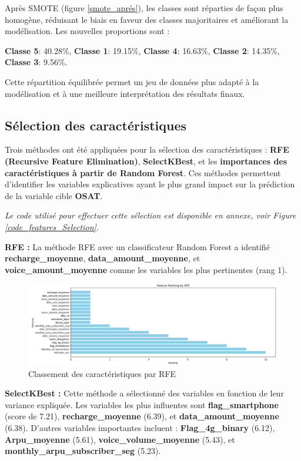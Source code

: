 Après SMOTE (figure \ref{smote_aprés}), les classes sont réparties de façon plus homogène, réduisant le biais en faveur des classes majoritaires et améliorant la modélisation. Les nouvelles proportions sont :

\textbf{Classe 5}: 40.28\%, \textbf{Classe 1}: 19.15\%, \textbf{Classe 4}: 16.63\%, \textbf{Classe 2}: 14.35\%, \textbf{Classe 3}: 9.56\%.

Cette répartition équilibrée permet un jeu de données plus adapté à la modélisation et à une meilleure interprétation des résultats finaux.

\subsection{Sélection des caractéristiques}
Trois méthodes ont été appliquées pour la sélection des caractéristiques : \textbf{RFE (Recursive Feature Elimination)}, \textbf{SelectKBest}, et les \textbf{importances des caractéristiques à partir de Random Forest}. Ces méthodes permettent d'identifier les variables explicatives ayant le plus grand impact sur la prédiction de la variable cible \textbf{OSAT}. 

\textit{Le code utilisé pour effectuer cette sélection est disponible en annexe, voir Figure \ref{code_features_Selection}.}

\textbf{RFE :} La méthode RFE avec un classificateur Random Forest a identifié \textbf{recharge\_moyenne}, \textbf{data\_amount\_moyenne}, et \textbf{voice\_amount\_moyenne} comme les variables les plus pertinentes (rang 1). 

\begin{figure}[H]
    \centering
    \includegraphics[width=0.8\linewidth]{capture_sas_65.png}
    \caption{Classement des caractéristiques par RFE}
\end{figure}

\textbf{SelectKBest :} Cette méthode a sélectionné des variables en fonction de leur variance expliquée. Les variables les plus influentes sont \textbf{flag\_smartphone} (score de 7.21), \textbf{recharge\_moyenne} (6.39), et \textbf{data\_amount\_moyenne} (6.38). D'autres variables importantes incluent :
\textbf{Flag\_4g\_binary} (6.12), \textbf{Arpu\_moyenne} (5.61), \textbf{voice\_volume\_moyenne} (5.43), et \textbf{monthly\_arpu\_subscriber\_seg} (5.23).

